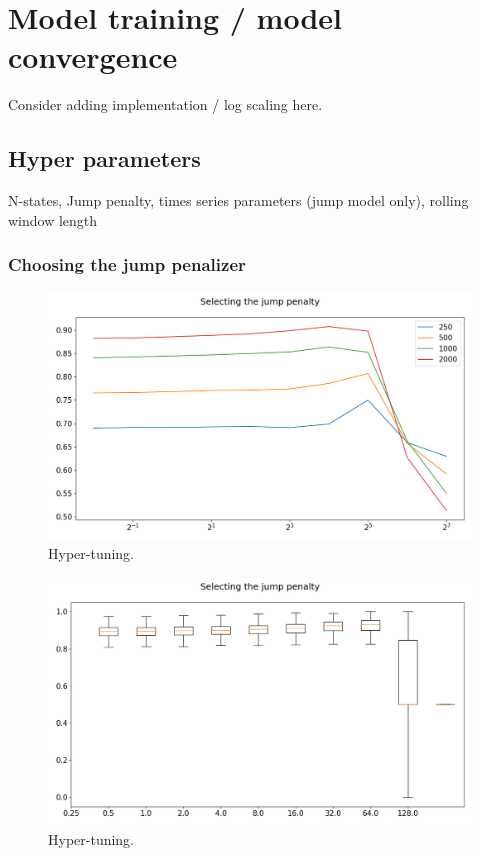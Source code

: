 \newpage

\section{Model training / model convergence}

Consider adding implementation / log scaling here.
 
\subsection{Hyper parameters}
 
N-states, Jump penalty, times series parameters (jump model only), rolling window length
 
\subsubsection{Choosing the jump penalizer}

\begin{figure}[H] 
    \centering
    \includegraphics[width=1\textwidth]{analysis/model_convergence/images/jump_penalties.png}
    \caption{Hyper-tuning.}
    \label{fig:jump_penalties}
\end{figure}

\begin{figure}[H] 
    \centering
    \includegraphics[width=1\textwidth]{analysis/model_convergence/images/jump_penalties_box.png}
    \caption{Hyper-tuning.}
\end{figure}


